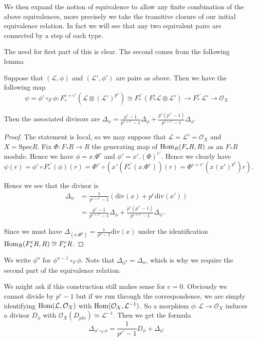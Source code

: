 \documentclass[a4paper,12pt]{book}
\newcommand{\Hom}{\textup{Hom}}
\newcommand{\Fe}{F^{e}_{*}}
\newcommand{\ox}[1][X]{\mathcal{O}_{#1}}
\begin{document}
We then expand the notion of equivalence to allow any finite combination of the above equivalences, more precisely we take the transitive closure of our initial equivalence relation. In fact we will see that any two equivalent pairs are connected by a step of each type.

The need for first part of this is clear. The second comes from the following lemma

\begin{lemma}\label{twist}
	Suppose that $(\mathcal{L},\phi)$ and $(\mathcal{L}',\phi')$ are pairs as above. Then we have the following map
	\[\psi= \phi' \circ_{F} \phi: F^{e+e'}_{*}(\mathcal{L}\otimes (\mathcal{L}')^{p^{e}})\cong F_{*}^{e'}(\Fe \mathcal{L} \otimes \mathcal{L}')\to F^{e'}_{*}\mathcal{L}'\to \ox \]
	
	Then the associated divisors are $\Delta_{\psi}= \frac{p^{e}-1}{p^{e+e'}-1}\Delta_{\phi} + \frac{p^{e}(p^{e'}-1)}{p^{e+e'}-1}\Delta_{\phi'}$
\end{lemma}

\begin{proof}
	
	The statement is local, so we may suppose that $\mathcal{L}=\mathcal{L}'=\mathcal{O}_{X}$ and $X= \text{Spec}R$. Fix $\Phi: F_{*}R \to R$ the generating map of $\Hom_{R}(F_{*}R,R)$ as an $F_{*}R$ module. Hence we have $\phi=x.\Phi^{e}$ and $\phi'=x'.(\Phi)^{e'}$. Hence we clearly have $$\psi(r)=\phi'\circ F_{*}^{e'}(\phi)(r)= \Phi^{e'}\circ (x'(F_{*}^{e'}(x.\Phi^{e}))(r)=\Phi^{e+e'}(x(x')^{p^{e}})r).$$
	
	
	Hence we see that the divisor is 
	\begin{align*}
	\Delta_{\psi} &= \frac{1}{p^{e+e'}-1}(\text{div}(x) + p^{e}\text{div}(x')) \\
	&=\frac{p^{e}-1}{p^{e+e'}-1}\Delta_{\phi} + \frac{p^{e}(p^{e'}-1)}{p^{e+e'}-1}\Delta_{\phi'}.
	\end{align*}
	
	Since we must have $\Delta_{(x.\Phi^{k})}= \frac{1}{p^{k}-1} \text{div}(x)$ under the identification $\Hom_{R}(\Fe R,R) \cong \Fe R$.

	
\end{proof}

We write $\phi^{n}$ for $\phi^{n-1}\circ_{F} \phi$. Note that $\Delta_{\phi^{n}}=\Delta_{\phi}$, which is why we require the second part of the equivalence relation.

We might ask if this construction still makes sense for $e=0$. Obviously we cannot divide by $p^{e}-1$ but if we run through the correspondence, we are simply identifying $\Hom(\mathcal{L},\ox)$ with $\Hom(\ox,\mathcal{L}^{-1})$. So a morphism $\phi: \mathcal{L} \to \ox$ induces a divisor $D_{\phi}$ with $\ox(D_{phi})\simeq \mathcal{L}^{-1}$. Then we get the formula
\[\Delta_{\phi' \circ_{F} \phi}= \frac{1}{p^{e'}-1}D_{\phi} + \Delta_{\phi'}\]
\end{document}
